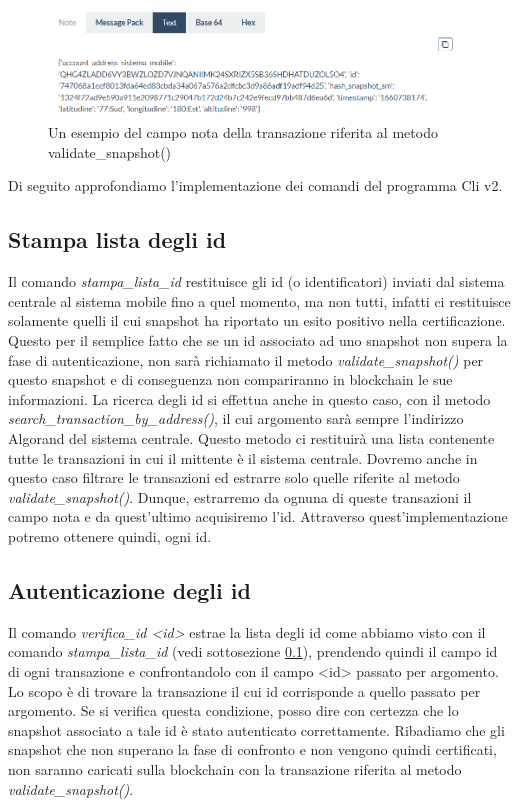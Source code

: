 \begin{figure}[!h]
\centering
\includegraphics[scale=0.8]{images/campo_nota.png}
\caption{Un esempio del campo nota della transazione riferita al metodo validate\_snapshot()}
\label{fig: camponota }
\end{figure}
Di seguito approfondiamo l'implementazione dei comandi del programma Cli v2.

\subsection{Stampa lista degli id}\label{stampalistaid}
Il comando \textit{stampa\_lista\_id} restituisce gli id (o identificatori) inviati dal sistema centrale al sistema mobile fino a quel momento, ma non tutti, infatti ci restituisce solamente quelli il cui snapshot ha riportato un esito positivo nella certificazione. Questo per il semplice fatto che se un id associato ad uno snapshot non supera la fase di autenticazione, non sarà richiamato il metodo \textit{validate\_snapshot()} per questo snapshot e di conseguenza non compariranno in blockchain le sue informazioni. La ricerca degli id si effettua anche in questo caso, con il metodo \textit{search\_transaction\_by\_address()}, il cui argomento sarà sempre l'indirizzo Algorand del sistema centrale. Questo metodo ci restituirà una lista contenente tutte le transazioni in cui il mittente è il sistema centrale. Dovremo anche in questo caso filtrare le transazioni ed estrarre solo quelle riferite al metodo \textit{validate\_snapshot()}. Dunque, estrarremo da ognuna di queste transazioni il campo nota e da quest'ultimo acquisiremo l'id. Attraverso quest'implementazione potremo ottenere quindi, ogni id.

\subsection{Autenticazione degli id}
Il comando \textit{verifica\_id <id>} estrae la lista degli id come abbiamo visto con il comando \textit{stampa\_lista\_id} (vedi sottosezione \ref{stampalistaid}), prendendo quindi il campo id di ogni transazione e confrontandolo con il campo <id> passato per argomento. Lo scopo è di trovare la transazione il cui id corrisponde a quello passato per argomento. Se si verifica questa condizione, posso dire con certezza che lo snapshot associato a tale id è stato autenticato correttamente. Ribadiamo che gli snapshot che non superano la fase di confronto e non vengono quindi certificati, non saranno caricati sulla blockchain con la transazione riferita al metodo \textit{validate\_snapshot()}.

